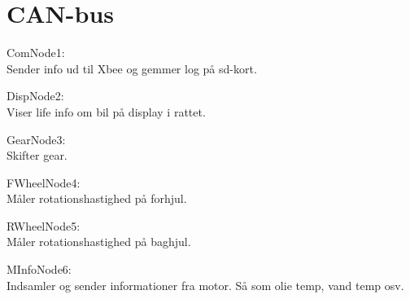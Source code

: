 \section{CAN-bus}

ComNode1:\\
Sender info ud til Xbee og gemmer log på sd-kort.

DispNode2:\\
Viser life info om bil på display i rattet.

GearNode3:\\
Skifter gear.

FWheelNode4:\\
Måler rotationshastighed på forhjul.

RWheelNode5:\\
Måler rotationshastighed på baghjul.

MInfoNode6:\\
Indsamler og sender informationer fra motor. Så som olie temp, vand temp osv.
